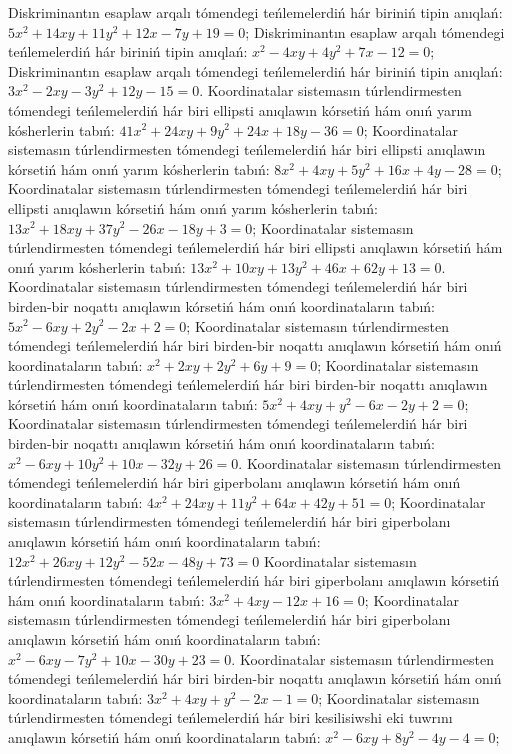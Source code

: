 Diskriminantın esaplaw arqalı tómendegi teńlemelerdiń hár biriniń tipin anıqlań: $5 x^2+14 x y+11 y^2+12 x-7 y+19=0$;
Diskriminantın esaplaw arqalı tómendegi teńlemelerdiń hár biriniń tipin anıqlań: $x^2-4 x y+4 y^2+7 x-12=0$;
Diskriminantın esaplaw arqalı tómendegi teńlemelerdiń hár biriniń tipin anıqlań: $3 x^2-2 x y-3 y^2+12 y-15=0$.
Koordinatalar sistemasın túrlendirmesten tómendegi teńlemelerdiń hár biri ellipsti anıqlawın kórsetiń hám onıń yarım kósherlerin tabıń: $41 x^2+24 x y+9 y^2+24 x+18 y-36=0$;
Koordinatalar sistemasın túrlendirmesten tómendegi teńlemelerdiń hár biri ellipsti anıqlawın kórsetiń hám onıń yarım kósherlerin tabıń: $8 x^2+4 x y+5 y^2+16 x+4 y-28=0$;
Koordinatalar sistemasın túrlendirmesten tómendegi teńlemelerdiń hár biri ellipsti anıqlawın kórsetiń hám onıń yarım kósherlerin tabıń: $13 x^2+18 x y+37 y^2-26 x-18 y+3=0$;
Koordinatalar sistemasın túrlendirmesten tómendegi teńlemelerdiń hár biri ellipsti anıqlawın kórsetiń hám onıń yarım kósherlerin tabıń: $13 x^2+10 x y+13 y^2+46 x+62 y+13=0$.
Koordinatalar sistemasın túrlendirmesten tómendegi teńlemelerdiń hár biri birden-bir noqattı anıqlawın kórsetiń hám onıń koordinataların tabıń: $5 x^2-6 x y+2 y^2-2 x+2=0$;
Koordinatalar sistemasın túrlendirmesten tómendegi teńlemelerdiń hár biri birden-bir noqattı anıqlawın kórsetiń hám onıń koordinataların tabıń: $x^2+2 x y+2 y^2+6 y+9=0$;
Koordinatalar sistemasın túrlendirmesten tómendegi teńlemelerdiń hár biri birden-bir noqattı anıqlawın kórsetiń hám onıń koordinataların tabıń: $5 x^2+4 x y+y^2-6 x-2 y+2=0$;
Koordinatalar sistemasın túrlendirmesten tómendegi teńlemelerdiń hár biri birden-bir noqattı anıqlawın kórsetiń hám onıń koordinataların tabıń: $x^2-6 x y+10 y^2+10 x-32 y+26=0$.
Koordinatalar sistemasın túrlendirmesten tómendegi teńlemelerdiń hár biri giperbolanı anıqlawın kórsetiń hám onıń koordinataların tabıń: $4 x^2+24 x y+11 y^2+64 x+42 y+51=0$;
Koordinatalar sistemasın túrlendirmesten tómendegi teńlemelerdiń hár biri giperbolanı anıqlawın kórsetiń hám onıń koordinataların tabıń: $12 x^2+26 x y+12 y^2-52 x-48 y+73=0$
Koordinatalar sistemasın túrlendirmesten tómendegi teńlemelerdiń hár biri giperbolanı anıqlawın kórsetiń hám onıń koordinataların tabıń: $3 x^2+4 x y-12 x+16=0$;
Koordinatalar sistemasın túrlendirmesten tómendegi teńlemelerdiń hár biri giperbolanı anıqlawın kórsetiń hám onıń koordinataların tabıń: $x^2-6 x y-7 y^2+10 x-30 y+23=0$.
Koordinatalar sistemasın túrlendirmesten tómendegi teńlemelerdiń hár biri birden-bir noqattı anıqlawın kórsetiń hám onıń koordinataların tabıń: $3 x^2+4 x y+y^2-2 x-1=0$;
Koordinatalar sistemasın túrlendirmesten tómendegi teńlemelerdiń hár biri kesilisiwshi eki tuwrını anıqlawın kórsetiń hám onıń koordinataların tabıń: $x^2-6 x y+8 y^2-4 y-4=0$;
